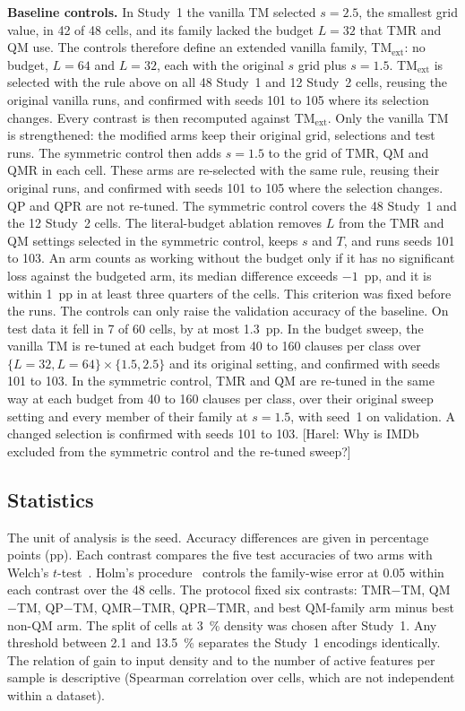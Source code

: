 \documentclass[preprint,12pt,times]{elsarticle}
\newcommand{\add}[1]{{\color{blue}#1}}
\newcommand{\hnote}[1]{\textcolor{harel}{[Harel: #1]}}
\begin{document}
\textbf{Baseline controls.} In Study~1 the vanilla TM selected $s = 2.5$, the smallest grid value, in 42 of 48 cells, and its family lacked the budget $L = 32$ that TMR and QM use.
The controls therefore define an extended vanilla family, TM$_{\mathrm{ext}}$: no budget, $L = 64$ and $L = 32$, each with the original $s$ grid plus $s = 1.5$.
TM$_{\mathrm{ext}}$ is selected with the rule above on all 48 Study~1 and 12 Study~2 cells, reusing the original vanilla runs, and confirmed with seeds 101 to 105 where its selection changes.
Every contrast is then recomputed against TM$_{\mathrm{ext}}$.
Only the vanilla TM is strengthened: the modified arms keep their original grid, selections and test runs.
\add{The symmetric control then adds $s = 1.5$ to the grid of TMR, QM and QMR in each cell.
These arms are re-selected with the same rule, reusing their original runs, and confirmed with seeds 101 to 105 where the selection changes.
QP and QPR are not re-tuned.
The symmetric control covers the 48 Study~1 and the 12 Study~2 cells.}
\add{The literal-budget ablation removes $L$ from the TMR and QM settings selected in the symmetric control, keeps $s$ and $T$, and runs seeds 101 to 103.
An arm counts as working without the budget only if it has no significant loss against the budgeted arm, its median difference exceeds $-1$~pp, and it is within 1~pp in at least three quarters of the cells.
This criterion was fixed before the runs.}
The controls can only raise the validation accuracy of the baseline. On test data it fell in 7 of 60 cells, by at most 1.3~pp.
In the budget sweep, the vanilla TM is re-tuned at each budget from 40 to 160 clauses per class over $\{L = 32, L = 64\} \times \{1.5, 2.5\}$ and its original setting, and confirmed with seeds 101 to 103.
\add{In the symmetric control, TMR and QM are re-tuned in the same way at each budget from 40 to 160 clauses per class, over their original sweep setting and every member of their family at {$s = 1.5$}, with seed~1 on validation. A changed selection is confirmed with seeds 101 to 103.}
\hnote{Why is IMDb excluded from the symmetric control and the re-tuned sweep?}

\subsection{Statistics}
The unit of analysis is the seed. Accuracy differences are given in percentage points (pp).
Each contrast compares the five test accuracies of two arms with Welch's $t$-test~\cite{welch1947}.
Holm's procedure~\cite{holm1979} controls the family-wise error at 0.05 within each contrast over the 48 cells.
The protocol fixed six contrasts: TMR$-$TM, QM$-$TM, QP$-$TM, QMR$-$TMR, QPR$-$TMR, and best QM-family arm minus best non-QM arm.
The split of cells at \SI{3}{\percent} density was chosen after Study~1. Any threshold between 2.1 and \SI{13.5}{\percent} separates the Study~1 encodings identically.
The relation of gain to input density and to the number of active features per sample is descriptive (Spearman correlation over cells, which are not independent within a dataset).
\end{document}
